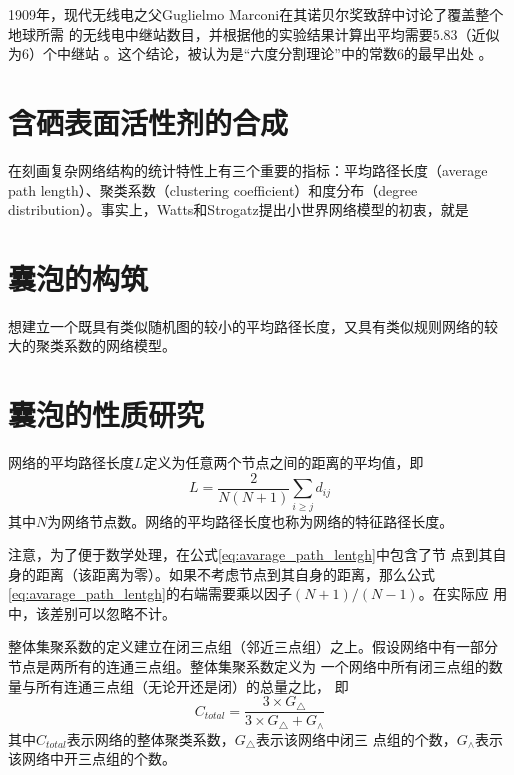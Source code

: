 \documentclass[bachelor,winfonts]{jnuthesis} %
\begin{document}
    1909年，现代无线电之父Guglielmo Marconi在其诺贝尔奖致辞中讨论了覆盖整个地球所需
    的无线电中继站数目，并根据他的实验结果计算出平均需要$5.83$（近似为$6$）个中继站
    \cite{marconi1909nobel}。这个结论，被认为是``六度分割理论''中的常数$6$的最早出处
    \cite{barabasi2003linked}。
    
    \section{含硒表面活性剂的合成}
    
    在刻画复杂网络结构的统计特性上有三个重要的指标：平均路径长度（average
    path length）、聚类系数（clustering coefficient）和度分布（degree
    distribution）。事实上，Watts和Strogatz提出小世界网络模型的初衷，就是
    
    \section{囊泡的构筑}
    
    想建立一个既具有类似随机图的较小的平均路径长度，又具有类似规则网络的较
    大的聚类系数的网络模型。
    
    \section{囊泡的性质研究}
    
    \begin{definition}[平均路径长度]
        网络的平均路径长度$L$定义为任意两个节点之间的距离的平均值，即
        \begin{equation}\label{eq:avarage_path_lentgh}
        L = \frac{2}{N(N+1)}\sum_{i\geq j}d_{ij}
        \end{equation}
        其中$N$为网络节点数。网络的平均路径长度也称为网络的特征路径长度。
    \end{definition}
    
    注意，为了便于数学处理，在公式\eqref{eq:avarage_path_lentgh}中包含了节
    点到其自身的距离（该距离为零）。如果不考虑节点到其自身的距离，那么公式
    \eqref{eq:avarage_path_lentgh}的右端需要乘以因子$(N+1)/(N-1)$。在实际应
    用中，该差别可以忽略不计。
    
    \begin{definition}[整体聚类系数]
        整体集聚系数的定义建立在闭三点组（邻近三点组）之上。假设网络中有一部分
        节点是两所有的连通三点组。整体集聚系数定义为
        一个网络中所有闭三点组的数量与所有连通三点组（无论开还是闭）的总量之比，
        即
        \[
        C_{total}=\frac{3\times G_{\triangle}}{3 \times G_{\triangle} + G_{\wedge}}
        \]
        其中$C_{total}$表示网络的整体聚类系数，$G_{\triangle}$表示该网络中闭三
        点组的个数，$G_{\wedge}$表示该网络中开三点组的个数\cite{luce1949method}。
    \end{definition}
    
\end{document}
